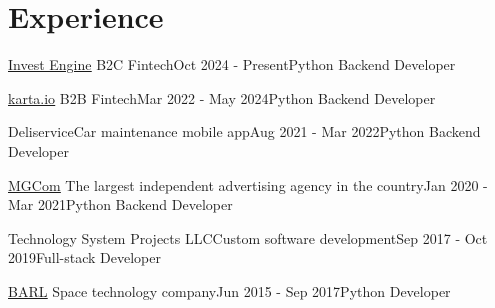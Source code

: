 \section{Experience}

\begin{experienceEntry}
{\href{https://investengine.com/}{\underline{Invest Engine}}}
{B2C Fintech}{Oct 2024 - Present}{Python Backend Developer}
    {}
\end{experienceEntry}

\begin{experienceEntry}
{\href{https://karta.io}{\underline{karta.io}}}
{B2B Fintech}{Mar 2022 - May 2024}{Python Backend Developer}
    {}
\end{experienceEntry}

\vspace{1em}

\begin{experienceEntry}{Deliservice}{Car maintenance mobile app}{Aug 2021 - Mar 2022}{Python Backend Developer}
    {}
\end{experienceEntry}

\vspace{1em}

\begin{experienceEntry}
{\href{https://mgcom.ru}{\underline{MGCom}}}
{The largest independent advertising agency in the country}{Jan 2020 - Mar 2021}{Python Backend Developer}
    {}
\end{experienceEntry}

\vspace{1em}

\begin{experienceEntry}{Technology System Projects LLC}{Custom software development}{Sep 2017 - Oct 2019}{Full-stack Developer}
    {}
\end{experienceEntry}

\vspace{1em}

\begin{experienceEntry}
{\href{https://barl.ru}{\underline{BARL}}}
{Space technology company}{Jun 2015 - Sep 2017}{Python Developer}
    {}
\end{experienceEntry}

